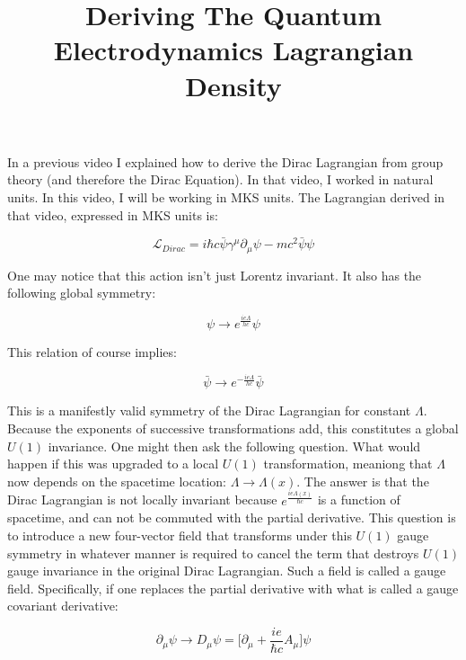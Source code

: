 \documentclass[a4]{article}
\begin{document}
    \title{Deriving The Quantum Electrodynamics Lagrangian Density}
    \maketitle

    In a previous video I explained how to derive the Dirac Lagrangian from group theory (and therefore the Dirac Equation).
    In that video, I worked in natural units. In this video, I will be working in MKS units. The Lagrangian derived in that
    video, expressed in MKS units is:

    \begin{equation}
        \mathcal{L}_{Dirac} = i \hbar c \bar{\psi} \gamma^{\mu} \partial_{\mu} \psi - m c^{2} \bar{\psi} \psi
    \end{equation}

    One may notice that this action isn't just Lorentz invariant. It also has the following global symmetry:

    \begin{equation}
        \psi \rightarrow e^{\frac{i e \Lambda}{h c}} \psi
    \end{equation}

    This relation of course implies:

    \begin{equation}
        \bar{\psi} \rightarrow e^{- \frac{i e \Lambda}{h c}} \bar{\psi}
    \end{equation}

    This is a manifestly valid symmetry of the Dirac Lagrangian for constant $\Lambda$. Because the exponents of successive
    transformations add, this constitutes a global $U(1)$ invariance. One might then ask the following question. What would
    happen if this was upgraded to a local $U(1)$ transformation, meaniong that $\Lambda$ now depends on the spacetime location:
    $\Lambda \rightarrow \Lambda (x)$. The answer is that the Dirac Lagrangian is not locally invariant because
    $e^{\frac{i e \Lambda (x)}{\hbar c}}$ is a function of spacetime, and can not be commuted with the partial derivative. This
    question is to introduce a new four-vector field that transforms under this $U(1)$ gauge symmetry in whatever manner is
    required to cancel the term that destroys $U(1)$ gauge invariance in the original Dirac Lagrangian. Such a field is called
    a gauge field. Specifically, if one replaces the partial derivative with what is called a gauge covariant derivative:

    \begin{equation}
        \partial_{\mu} \psi \rightarrow D_{\mu} \psi = \Bigg[ \partial_{\mu} + \frac{i e}{\hbar c} A_{\mu} \Bigg] \psi
    \end{equation}
\end{document}
